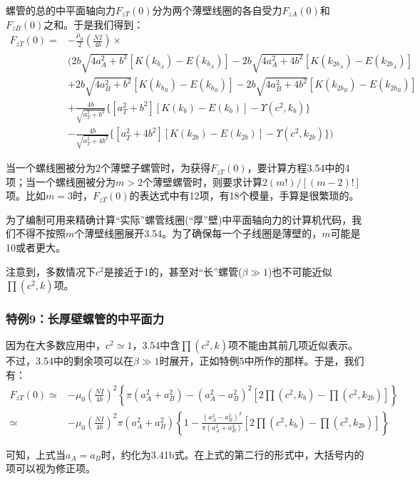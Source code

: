 螺管的总的中平面轴向力$F_{zT}(0)$分为两个薄壁线圈的各自受力$F_{zA}(0)$和$F_{zB}(0)$之和。于是我们得到：
\begin{equation}
\begin{split}
F_{zT}(0)=&-\frac{\mu_0}{2}(\frac{N I}{4b})\times \\
&\bigg(2b\sqrt{4a_A^2+b^2}[K(k_{b_A})-E(k_{b_A})]-2b\sqrt{4a_A^2+4b^2}[K(k_{2b_A})-E(k_{2b_A})]\\
&+2b\sqrt{4a_B^2+b^2}[K(k_{b_B})-E(k_{b_B})]-2b\sqrt{4a_B^2+4b^2}[K(k_{2b_B})-E(k_{2b_B})]\\
&+\frac{4b}{\sqrt{a_T^2+b^2}} \{[a_T^2+b^2][K(k_{b})-E(k_{b})]-\Upsilon(c^2,k_b)\}\\
&-\frac{4b}{\sqrt{a_T^2+4b^2}} \{[a_T^2+4b^2][K(k_{2b})-E(k_{2b})]-\Upsilon(c^2,k_{2b}) \}\bigg)
\end{split}
\end{equation}

当一个螺线圈被分为2个薄壁子螺管时，为获得$F_{zT}(0)$，要计算方程3.54中的4项；当一个螺线圈被分为$m>2$个薄壁螺管时，则要求计算$2(m!)/[(m−2)!]$项。比如$m=3$时，$F_{zT}(0)$的表达式中有12项，有18个模量，手算是很繁琐的。

为了编制可用来精确计算“实际”螺管线圈(“厚”壁)中平面轴向力的计算机代码，我们不得不按照$m$个薄壁线圈展开3.54。为了确保每一个子线圈是薄壁的，$m$可能是10或者更大。

注意到，多数情况下$c^2$是接近于1的，甚至对“长”螺管($\beta\gg 1$)也不可能近似$\prod(c^2,k)$项。

\subsubsection{特例9：长厚壁螺管的中平面力}
因为在大多数应用中，$c^2\simeq 1$，3.54中含$\prod{(c^2,k)}$项不能由其前几项近似表示。不过，3.54中的剩余项可以在$\beta \gg 1$时展开，正如特例5中所作的那样。于是，我们有：
\begin{equation}
\begin{split}
F_{zT}(0)\simeq& -\mu_0 (\frac{N I}{4b})^2\left\{ \pi(a_A^2+a_B^2)-(a_A^2-a_B^2)^2[2\prod(c^2,k_b)-\prod(c^2,k_{2b})]\right\}  \\
\simeq& -\mu_0 (\frac{N I}{4b})^2 \pi(a_A^2+a_B^2) \left\{1-\frac{(a_A^2-a_B^2)^2}{\pi(a_A^2+a_B^2)}[2\prod(c^2,k_b)-\prod(c^2,k_{2b})]\right\}
\end{split}
\end{equation}

可知，上式当$a_A=a_B$时，约化为3.41b式。在上式的第二行的形式中，大括号内的项可以视为修正项。

